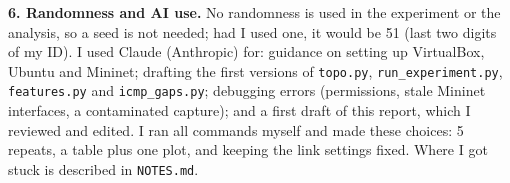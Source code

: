 \documentclass[10pt,a4paper]{article}
\begin{document}
\textbf{6. Randomness and AI use.}
No randomness is used in the experiment or the analysis, so a seed is not needed; had I used one, it would be 51 (last two digits of my ID). I used Claude (Anthropic) for: guidance on setting up VirtualBox, Ubuntu and Mininet; drafting the first versions of \texttt{topo.py}, \texttt{run\_experiment.py}, \texttt{features.py} and \texttt{icmp\_gaps.py}; debugging errors (permissions, stale Mininet interfaces, a contaminated capture); and a first draft of this report, which I reviewed and edited. I ran all commands myself and made these choices: 5 repeats, a table plus one plot, and keeping the link settings fixed. Where I got stuck is described in \texttt{NOTES.md}.
\end{document}
